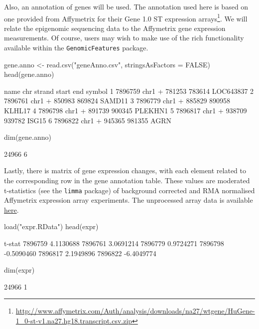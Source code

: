 Also, an annotation of genes will be used. The annotation used here is based on one provided from Affymetrix for their Gene 1.0 ST expression arrays\footnote{\href{http://www.affymetrix.com/Auth/analysis/downloads/na27/wtgene/HuGene-1\_0-st-v1.na27.hg18.transcript.csv.zip}{http://www.affymetrix.com/Auth/analysis/downloads/na27/wtgene/HuGene-1\_0-st-v1.na27.hg18.transcript.csv.zip}}. We will relate the epigenomic sequencing data to the Affymetrix gene expression measurements.  Of course, users may wish to make use of the rich functionality available within the \texttt{GenomicFeatures} package.
 
\begin{Schunk}
\begin{Sinput}
 gene.anno <- read.csv("geneAnno.csv", stringsAsFactors = FALSE)
 head(gene.anno)
\end{Sinput}
\begin{Soutput}
     name  chr strand  start    end    symbol
1 7896759 chr1      + 781253 783614 LOC643837
2 7896761 chr1      + 850983 869824    SAMD11
3 7896779 chr1      + 885829 890958    KLHL17
4 7896798 chr1      + 891739 900345   PLEKHN1
5 7896817 chr1      + 938709 939782     ISG15
6 7896822 chr1      + 945365 981355      AGRN
\end{Soutput}
\begin{Sinput}
 dim(gene.anno)
\end{Sinput}
\begin{Soutput}
[1] 24966     6
\end{Soutput}
\end{Schunk}

\noindent Lastly, there is matrix of gene expression changes, with each element related to the corresponding row in the gene annotation table. These values are moderated t-statistics (see the \texttt{limma} package) of background corrected and RMA normalised Affymetrix expression array experiments. The unprocessed array data is available \href{http://www.ncbi.nlm.nih.gov/geo/query/acc.cgi?acc=GSE19726}{here}.

\begin{Schunk}
\begin{Sinput}
 load("expr.RData")
 head(expr)
\end{Sinput}
\begin{Soutput}
            t-stat
7896759  4.1130688
7896761  3.0691214
7896779  0.9724271
7896798 -0.5090460
7896817  2.1949896
7896822 -6.4049774
\end{Soutput}
\begin{Sinput}
 dim(expr)
\end{Sinput}
\begin{Soutput}
[1] 24966     1
\end{Soutput}
\end{Schunk}
